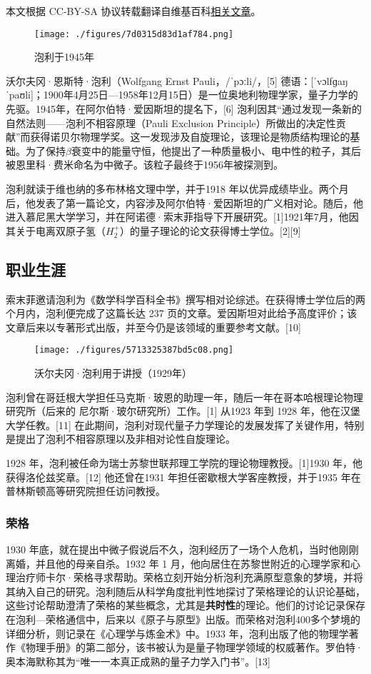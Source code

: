 
本文根据 CC-BY-SA 协议转载翻译自维基百科\href{https://en.wikipedia.org/wiki/Wolfgang_Pauli}{相关文章}。

\begin{figure}[ht]
\centering
\texttt{[image: ./figures/7d0315d83d1af784.png]}
\caption{泡利于1945年} \label{fig_Pauli2_1}
\end{figure}
沃尔夫冈·恩斯特·泡利（Wolfgang Ernst Pauli，/ˈpɔːli/，[5] 德语：[ˈvɔlfɡaŋ ˈpaʊli]；1900年4月25日—1958年12月15日）是一位奥地利物理学家，量子力学的先驱。1945年，在阿尔伯特·爱因斯坦的提名下，[6] 泡利因其“通过发现一条新的自然法则——泡利不相容原理（Pauli Exclusion Principle）所做出的决定性贡献”而获得诺贝尔物理学奖。这一发现涉及自旋理论，该理论是物质结构理论的基础。为了保持\(\beta\)衰变中的能量守恒，他提出了一种质量极小、电中性的粒子，其后被恩里科·费米命名为中微子。该粒子最终于1956年被探测到。

泡利就读于维也纳的多布林格文理中学，并于1918 年以优异成绩毕业。两个月后，他发表了第一篇论文，内容涉及阿尔伯特·爱因斯坦的广义相对论。随后，他进入慕尼黑大学学习，并在阿诺德·索末菲指导下开展研究。[1]1921年7月，他因其关于电离双原子氢（\(H_2^+\)）的量子理论的论文获得博士学位。[2][9]
\subsection{职业生涯}  
索末菲邀请泡利为《数学科学百科全书》撰写相对论综述。在获得博士学位后的两个月内，泡利便完成了这篇长达 237 页的文章。爱因斯坦对此给予高度评价；该文章后来以专著形式出版，并至今仍是该领域的重要参考文献。[10]
\begin{figure}[ht]
\centering
\texttt{[image: ./figures/5713325387bd5c08.png]}
\caption{沃尔夫冈·泡利用于讲授（1929年）} \label{fig_Pauli2_2}
\end{figure}
泡利曾在哥廷根大学担任马克斯·玻恩的助理一年，随后一年在哥本哈根理论物理研究所（后来的 尼尔斯·玻尔研究所）工作。[1] 从1923 年到 1928 年，他在汉堡大学任教。[11] 在此期间，泡利对现代量子力学理论的发展发挥了关键作用，特别是提出了泡利不相容原理以及非相对论性自旋理论。

1928 年，泡利被任命为瑞士苏黎世联邦理工学院的理论物理教授。[1]1930 年，他获得洛伦兹奖章。[12] 他还曾在1931 年担任密歇根大学客座教授，并于1935 年在普林斯顿高等研究院担任访问教授。
\subsubsection{荣格}  
1930 年底，就在提出中微子假说后不久，泡利经历了一场个人危机，当时他刚刚离婚，并且他的母亲自杀。1932 年 1 月，他向居住在苏黎世附近的心理学家和心理治疗师卡尔·荣格寻求帮助。荣格立刻开始分析泡利充满原型意象的梦境，并将其纳入自己的研究。泡利随后从科学角度批判性地探讨了荣格理论的认识论基础，这些讨论帮助澄清了荣格的某些概念，尤其是\textbf{共时性}的理论。他们的讨论记录保存在泡利—荣格通信中，后来以《原子与原型》出版。而荣格对泡利400多个梦境的详细分析，则记录在《心理学与炼金术》中。1933 年，泡利出版了他的物理学著作《物理手册》的第二部分，该书被认为是量子物理学领域的权威著作。罗伯特·奥本海默称其为“唯一一本真正成熟的量子力学入门书”。[13]

